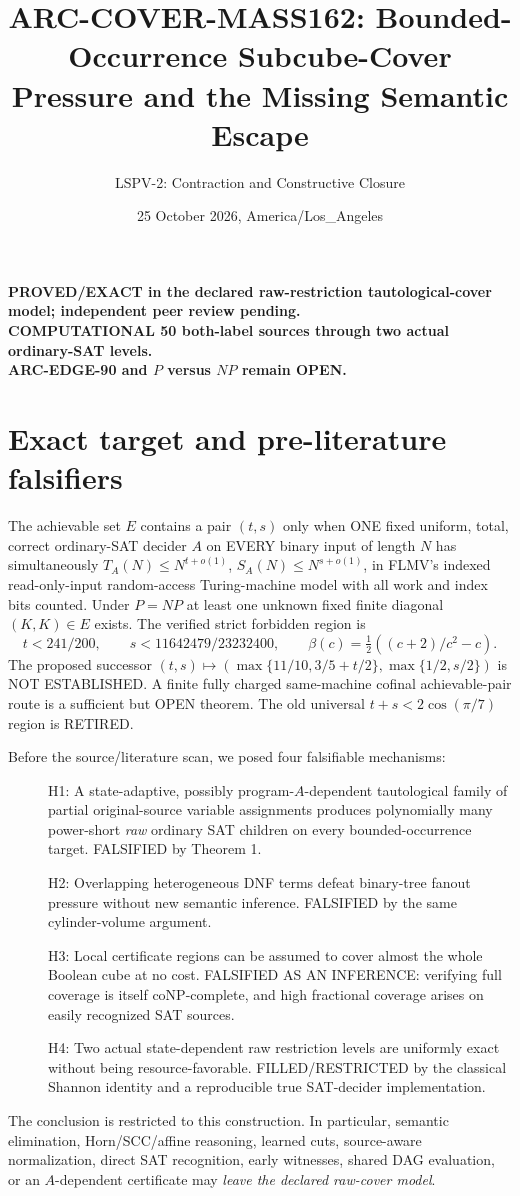 \documentclass[11pt]{article}
\title{ARC-COVER-MASS162: Bounded-Occurrence Subcube-Cover Pressure and the Missing Semantic Escape}
\author{LSPV-2: Contraction and Constructive Closure}
\date{25 October 2026, America/Los\_Angeles}
\begin{document}
\maketitle
\begin{center}
\textbf{PROVED/EXACT in the declared raw-restriction tautological-cover model;
independent peer review pending.}\\
\textbf{COMPUTATIONAL 50 both-label sources through two actual ordinary-SAT levels.}\\
\textbf{ARC-EDGE-90 and $P$ versus $NP$ remain OPEN.}
\end{center}

\section{Exact target and pre-literature falsifiers}
The achievable set $E$ contains a pair $(t,s)$ only when
ONE fixed uniform, total, correct ordinary-SAT decider $A$
on EVERY binary input of length $N$ has simultaneously
$T_A(N)\le N^{t+o(1)}$, $S_A(N)\le N^{s+o(1)}$,
in FLMV's indexed read-only-input random-access Turing-machine model
with all work and index bits counted. Under $P=NP$ at least one
unknown fixed finite diagonal $(K,K)\in E$ exists.
The verified strict forbidden region is
\[
 t<241/200,\qquad s<11642479/23232400,\qquad
 \beta(c)=\tfrac12((c+2)/c^2-c).
\]
The proposed successor
$(t,s)\mapsto(\max\{11/10,3/5+t/2\},\max\{1/2,s/2\})$
is NOT ESTABLISHED. A finite fully charged same-machine
cofinal achievable-pair route is a sufficient but OPEN theorem.
The old universal $t+s<2\cos(\pi/7)$ region is RETIRED.

Before the source/literature scan, we posed four falsifiable mechanisms:
\begin{description}
\item[] H1: A state-adaptive, possibly program-$A$-dependent
tautological family of partial original-source variable assignments
produces polynomially many power-short \emph{raw} ordinary SAT children
on every bounded-occurrence target. FALSIFIED by Theorem 1.
\item[] H2: Overlapping heterogeneous DNF terms defeat
binary-tree fanout pressure without new semantic inference.
FALSIFIED by the same cylinder-volume argument.
\item[] H3: Local certificate regions can be assumed to
cover almost the whole Boolean cube at no cost. FALSIFIED AS
AN INFERENCE: verifying full coverage is itself coNP-complete,
and high fractional coverage arises on easily recognized SAT sources.
\item[] H4: Two actual state-dependent raw restriction levels
are uniformly exact without being resource-favorable.
FILLED/RESTRICTED by the classical Shannon identity and
a reproducible true SAT-decider implementation.
\end{description}
The conclusion is restricted to this construction. In particular,
semantic elimination, Horn/SCC/affine reasoning, learned cuts,
source-aware normalization, direct SAT recognition, early witnesses,
shared DAG evaluation, or an $A$-dependent certificate may
\emph{leave the declared raw-cover model}.
\end{document}
